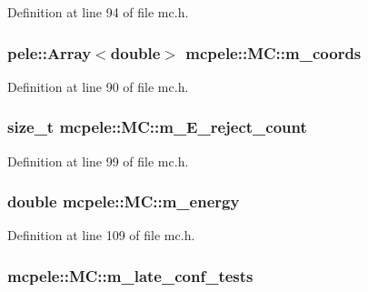 \-Definition at line 94 of file mc.\-h.

\hypertarget{classmcpele_1_1MC_a3a38fa108292b3e7270ad439ebb2c886}{
\subsubsection[{m\-\_\-coords}]{\setlength{\rightskip}{0pt plus 5cm}pele\-::\-Array$<$double$>$ {\bf mcpele\-::\-M\-C\-::m\-\_\-coords}}}\label{classmcpele_1_1MC_a3a38fa108292b3e7270ad439ebb2c886}


\-Definition at line 90 of file mc.\-h.

\hypertarget{classmcpele_1_1MC_a98a00b35b659a559433c7f4bba313c34}{
\subsubsection[{m\-\_\-\-E\-\_\-reject\-\_\-count}]{\setlength{\rightskip}{0pt plus 5cm}size\-\_\-t {\bf mcpele\-::\-M\-C\-::m\-\_\-\-E\-\_\-reject\-\_\-count}}}\label{classmcpele_1_1MC_a98a00b35b659a559433c7f4bba313c34}


\-Definition at line 99 of file mc.\-h.

\hypertarget{classmcpele_1_1MC_a61af4e6db5014d3ab4251dd38aca68f5}{
\subsubsection[{m\-\_\-energy}]{\setlength{\rightskip}{0pt plus 5cm}double {\bf mcpele\-::\-M\-C\-::m\-\_\-energy}}}\label{classmcpele_1_1MC_a61af4e6db5014d3ab4251dd38aca68f5}


\-Definition at line 109 of file mc.\-h.

\hypertarget{classmcpele_1_1MC_a6910233a8f6223c7826eebacb3f48f6c}{
\subsubsection[{m\-\_\-late\-\_\-conf\-\_\-tests}]{ {\bf mcpele\-::\-M\-C\-::m\-\_\-late\-\_\-conf\-\_\-tests}}}\label{classmcpele_1_1MC_a6910233a8f6223c7826eebacb3f48f6c}


